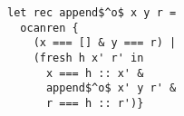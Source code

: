 \begin{lstlisting}
let rec append$^o$ x y r =
  ocanren {
    (x === [] & y === r) |
    (fresh h x' r' in
      x === h :: x' &
      append$^o$ x' y r' &
      r === h :: r')}
\end{lstlisting}